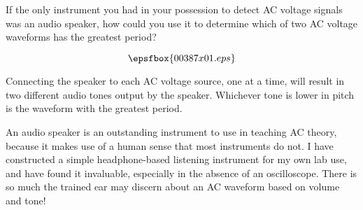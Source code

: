 

If the only instrument you had in your possession to detect AC voltage signals was an audio speaker, how could you use it to determine which of two AC voltage waveforms has the greatest period?

$$\epsfbox{00387x01.eps}$$







Connecting the speaker to each AC voltage source, one at a time, will result in two different audio tones output by the speaker.  Whichever tone is lower in pitch is the waveform with the greatest period.







An audio speaker is an outstanding instrument to use in teaching AC theory, because it makes use of a human sense that most instruments do not.  I have constructed a simple headphone-based listening instrument for my own lab use, and have found it invaluable, especially in the absence of an oscilloscope.  There is so much the trained ear may discern about an AC waveform based on volume and tone!




